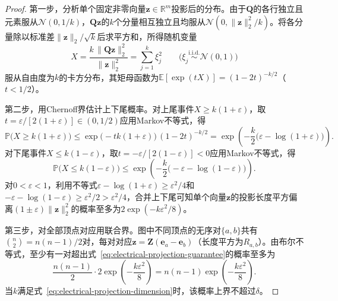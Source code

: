 \begin{proof}
第一步，分析单个固定非零向量$\bm z\in\mathbb R^m$投影后的分布。由于$\bm Q$的各行独立且元素服从$\mathcal N(0,1/k)$，$\bm Q\bm z$的$k$个分量相互独立且均服从$\mathcal N(0,\lVert\bm z\rVert_2^2/k)$。将各分量除以标准差$\lVert\bm z\rVert_2/\sqrt{k}$后求平方和，所得随机变量
\[
  X = \frac{k\,\lVert\bm Q\bm z\rVert_2^2}{\lVert\bm z\rVert_2^2}=\sum_{j=1}^k \xi_j^2\qquad\bigl(\xi_j\stackrel{\mathrm{i.i.d.}}{\sim}\mathcal N(0,1)\bigr)
\]
服从自由度为$k$的卡方分布，其矩母函数为$\mathbb E[\exp(tX)] = (1 - 2t)^{-k/2}$（$t<1/2$）。

第二步，用Chernoff界估计上下尾概率。对上尾事件$X \geq k(1 + \varepsilon)$，取$t = \varepsilon/[2(1 + \varepsilon)]\in(0,1/2)$应用Markov不等式，得
\[
  \mathbb P\bigl(X \geq k(1 + \varepsilon)\bigr)
  \leq \exp\bigl(-tk(1 + \varepsilon)\bigr)\,(1 - 2t)^{-k/2}
  = \exp\!\left(-\frac{k}{2}\bigl(\varepsilon - \log(1 + \varepsilon)\bigr)\right).
\]
对下尾事件$X \leq k(1 - \varepsilon)$，取$t = -\varepsilon/[2(1 - \varepsilon)] < 0$应用Markov不等式，得
\[
  \mathbb P\bigl(X \leq k(1 - \varepsilon)\bigr)
  \leq \exp\!\left(-\frac{k}{2}\bigl(-\varepsilon - \log(1 - \varepsilon)\bigr)\right).
\]
对$0 < \varepsilon < 1$，利用不等式$\varepsilon-\log(1+\varepsilon)\geq\varepsilon^2/4$和$-\varepsilon-\log(1-\varepsilon)\geq\varepsilon^2/2>\varepsilon^2/4$，合并上下尾可知单个向量$\bm z$的投影长度平方偏离$(1 \pm \varepsilon)\lVert\bm z\rVert_2^2$的概率至多为$2\exp(-k\varepsilon^2/8)$。

第三步，对全部顶点对应用联合界。图中不同顶点的无序对$\{a,b\}$共有$\binom{n}{2}=n(n-1)/2$对，每对对应$\bm z=\bm Z(\bm e_a - \bm e_b)$（长度平方为$R_{a,b}$）。由布尔不等式，至少有一对超出式~\eqref{eq:electrical-projection-guarantee}的概率至多为
\[
  \frac{n(n-1)}{2}\cdot 2\exp\!\left(-\frac{k\varepsilon^2}{8}\right)=n(n-1)\exp\!\left(-\frac{k\varepsilon^2}{8}\right).
\]
当$k$满足式~\eqref{eq:electrical-projection-dimension}时，该概率上界不超过$\delta$。
\end{proof}

